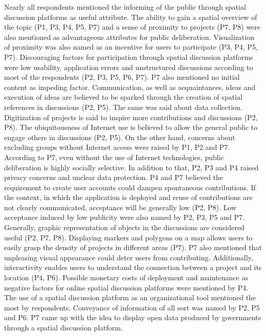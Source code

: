 Nearly all respondents mentioned the informing of the public through spatial discussion platforms as useful attribute. The ability to gain a spatial overview of the topic (P1, P3, P4, P5, P7) and a sense of proximity to projects (P7, P8) were also mentioned as advantageous attributes for public deliberation. Visualization of proximity was also named as an incentive for users to participate (P3, P4, P5, P7). Discouraging factors for participation through spatial discussion platforms were low usability, application errors and unstructured discussions according to most of the respondents (P2, P3, P5, P6, P7). P7 also mentioned no initial content as impeding factor. Communication, as well as acquaintances, ideas and execution of ideas are believed to be sparked through the creation of spatial references in discussions (P2, P5). The same was said about data collection. Digitization of projects is said to inspire more contributions and discussions (P2, P8). The ubiquitousness of Internet use is believed to allow the general public to engage others in discussions (P2, P5). On the other hand, concerns about excluding groups without Internet access were raised by P1, P2 and P7. According to P7, even without the use of Internet technologies, public deliberation is highly socially selective. In addition to that, P2, P3 and P4 raised privacy concerns and unclear data protection. P4 and P7 believed the requirement to create user accounts could dampen spontaneous contributions. If the context, in which the application is deployed and reuse of contributions are not clearly communicated, acceptance will be generally low (P2, P8). Low acceptance induced by low publicity were also named by P2, P3, P5 and P7. Generally, graphic representation of objects in the discussions are considered useful (P2, P7, P8). Displaying markers and polygons on a map allows users to easily grasp the density of projects in different areas (P7). P7 also mentioned that unpleasing visual appearance could deter users from contributing. Additionally, interactivity enables users to understand the connection between a project and its location (P4, P6). Possible monetary costs of deployment and maintenance as negative factors for online spatial discussion platforms were mentioned by P4.\\
The use of a spatial discussion platform as an organizational tool mentioned the most by respondents. Conveyance of information of all sort was named by P2, P5 and P6. P7 came up with the idea to display open data produced by governments through a spatial discussion platform.

